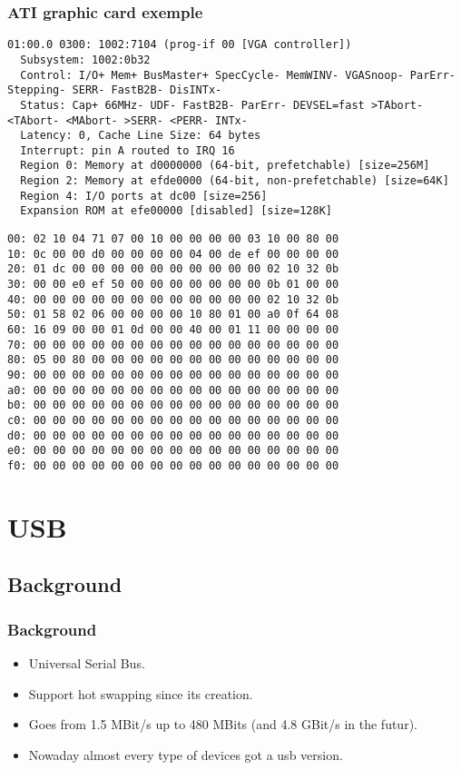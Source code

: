 \begin{frame}[fragile]
\frametitle{ATI graphic card exemple}
\begin{verbatim}
01:00.0 0300: 1002:7104 (prog-if 00 [VGA controller])
  Subsystem: 1002:0b32
  Control: I/O+ Mem+ BusMaster+ SpecCycle- MemWINV- VGASnoop- ParErr- Stepping- SERR- FastB2B- DisINTx-
  Status: Cap+ 66MHz- UDF- FastB2B- ParErr- DEVSEL=fast >TAbort- <TAbort- <MAbort- >SERR- <PERR- INTx-
  Latency: 0, Cache Line Size: 64 bytes
  Interrupt: pin A routed to IRQ 16
  Region 0: Memory at d0000000 (64-bit, prefetchable) [size=256M]
  Region 2: Memory at efde0000 (64-bit, non-prefetchable) [size=64K]
  Region 4: I/O ports at dc00 [size=256]
  Expansion ROM at efe00000 [disabled] [size=128K]
\end{verbatim}

\begin{verbatim}
00: 02 10 04 71 07 00 10 00 00 00 00 03 10 00 80 00
10: 0c 00 00 d0 00 00 00 00 04 00 de ef 00 00 00 00
20: 01 dc 00 00 00 00 00 00 00 00 00 00 02 10 32 0b
30: 00 00 e0 ef 50 00 00 00 00 00 00 00 0b 01 00 00
40: 00 00 00 00 00 00 00 00 00 00 00 00 02 10 32 0b
50: 01 58 02 06 00 00 00 00 10 80 01 00 a0 0f 64 08
60: 16 09 00 00 01 0d 00 00 40 00 01 11 00 00 00 00
70: 00 00 00 00 00 00 00 00 00 00 00 00 00 00 00 00
80: 05 00 80 00 00 00 00 00 00 00 00 00 00 00 00 00
90: 00 00 00 00 00 00 00 00 00 00 00 00 00 00 00 00
a0: 00 00 00 00 00 00 00 00 00 00 00 00 00 00 00 00
b0: 00 00 00 00 00 00 00 00 00 00 00 00 00 00 00 00
c0: 00 00 00 00 00 00 00 00 00 00 00 00 00 00 00 00
d0: 00 00 00 00 00 00 00 00 00 00 00 00 00 00 00 00
e0: 00 00 00 00 00 00 00 00 00 00 00 00 00 00 00 00
f0: 00 00 00 00 00 00 00 00 00 00 00 00 00 00 00 00
\end{verbatim}
\end{frame}

\section{USB}
\subsection*{Background}
\begin{frame}
\frametitle{Background}
\begin{itemize}
\item Universal Serial Bus.
\item Support hot swapping since its creation.
\item Goes from 1.5 MBit/s up to 480 MBits (and 4.8 GBit/s in the futur).
\item Nowaday almost every type of devices got a usb version.
\end{itemize}
\end{frame}

